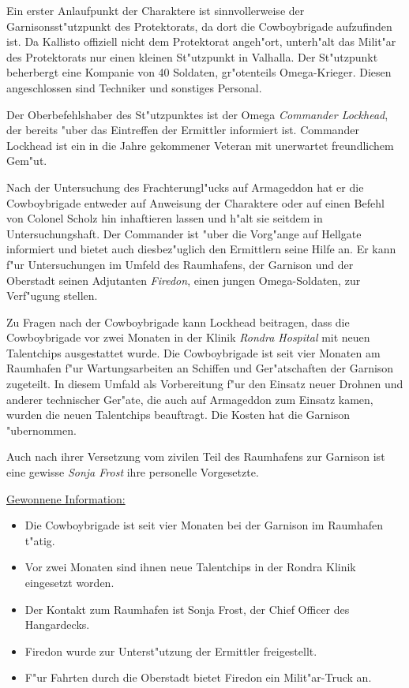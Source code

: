 
Ein erster Anlaufpunkt der Charaktere ist sinnvollerweise der Garnisonsst"utzpunkt des Protektorats, da dort die Cowboybrigade aufzufinden ist. Da Kallisto offiziell nicht dem Protektorat angeh"ort, unterh"alt das Milit"ar des Protektorats nur einen kleinen St"utzpunkt in Valhalla. Der St"utzpunkt beherbergt eine Kompanie von 40 Soldaten, gr"o\3tenteils Omega-Krieger. Diesen angeschlossen sind Techniker und sonstiges Personal.

Der Oberbefehlshaber des St"utzpunktes ist der Omega \emph{Commander Lockhead}, der bereits "uber das Eintreffen der Ermittler informiert ist. Commander Lockhead ist ein in die Jahre gekommener Veteran mit unerwartet freundlichem Gem"ut.

Nach der Untersuchung des Frachterungl"ucks auf Armageddon hat er die Cowboybrigade entweder auf Anweisung der Charaktere oder auf einen Befehl von Colonel Scholz hin inhaftieren lassen und h"alt sie seitdem in Untersuchungshaft. Der Commander ist "uber die Vorg"ange auf Hellgate informiert und bietet auch diesbez"uglich den Ermittlern seine Hilfe an. Er kann f"ur Untersuchungen im Umfeld des Raumhafens, der Garnison und der Oberstadt seinen Adjutanten \emph{Firedon}, einen jungen Omega-Soldaten, zur Verf"ugung stellen.

Zu Fragen nach der Cowboybrigade kann Lockhead beitragen, dass die Cowboybrigade vor zwei Monaten in der Klinik \emph{Rondra Hospital} mit neuen Talentchips ausgestattet wurde. Die Cowboybrigade ist seit vier Monaten am Raumhafen f"ur Wartungsarbeiten an Schiffen und Ger"atschaften der Garnison zugeteilt. In diesem Umfald als Vorbereitung f"ur den Einsatz neuer Drohnen und anderer technischer Ger"ate, die auch auf Armageddon zum Einsatz kamen, wurden die neuen Talentchips beauftragt. Die Kosten hat die Garnison "ubernommen. 

Auch nach ihrer Versetzung vom zivilen Teil des Raumhafens zur Garnison ist eine gewisse \emph{Sonja Frost} ihre personelle Vorgesetzte.

\begin{remarks}
	\underline{Gewonnene Information:}
	
	\begin{itemize}
		\item Die Cowboybrigade ist seit vier Monaten bei der Garnison im Raumhafen t"atig. 
		\item Vor zwei Monaten sind ihnen neue Talentchips in der Rondra Klinik eingesetzt worden.		
		\item Der Kontakt zum Raumhafen ist Sonja Frost, der Chief Officer des Hangardecks.
		\item Firedon wurde zur Unterst"utzung der Ermittler freigestellt.
		\item F"ur Fahrten durch die Oberstadt bietet Firedon ein Milit"ar-Truck an.
	\end{itemize}
\end{remarks}

